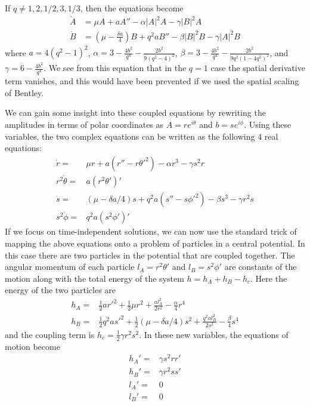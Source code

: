 \documentclass[api,pof,pre,12pt,a4paper]{revtex4-1}
\begin{document}
If $q\neq 1,2,1/2,3, 1/3$, then the equations become
\begin{align}
\dot{A}&=\mu A+a  A''-\alpha|A|^2A-\gamma|B|^2 A\\
\dot{B}&=\left(\mu-\frac{\delta a}{4}\right) B+q^2 a  B''-\beta|B|^2B-\gamma|A|^2 B
\end{align}
where $a=4(q^2-1)^2$, $\alpha=3-\tfrac{4 b^2}{q^4}-\tfrac{2 b^2}{9(q^2-4)^2}$, $\beta=3-\tfrac{4 b^2}{q^4}-\tfrac{2 b^2}{9q^2(1-4q^2)^2}$, and $\gamma=6-\frac{4 b^2}{q^4}$. We see from this equation that in the $q=1$ case the spatial derivative term vanishes, and this would have been prevented if we used the spatial scaling of Bentley.

We can gain some insight into these coupled equations by rewriting the amplitudes in terms of polar coordinates as $A=r e^{i\theta}$ and $b= s e^{i\phi}$.  Using these variables, the two complex equations can be written as the following 4 real equations:
\begin{subequations}
\begin{align}
\dot{r}=&\mu r + a(r'' - r\theta'^2) -\alpha r^3-\gamma s^2 r
\label{eq:rpolar} \\
r^2\dot{\theta}=&a(r^2\theta')'
\label{eq:thpolar}\\
\dot{s}=&(\mu-\delta a/4) s + q^2 a(s'' - s\phi'^2) -\beta s^3-\gamma r^2 s
\label{eq:spolar}\\
s^2\dot{\phi}=&q^2 a (s^2\phi')'
\label{eq:phpolar}
\end{align}
\end{subequations}
If we focus on time-independent solutions, we can now use the standard trick of mapping the above equations onto a problem of particles in a central potential.  In this case there are two particles in the potential that are coupled together.  The angular momentum of each particle $l_A=r^2\theta'$ and $l_B=s^2\phi'$ are constants of the motion along with the total energy of the system $h=h_A+h_B - h_c$.  Here the energy of the two particles are 
\begin{subequations}
\begin{align}
h_A=&\frac{1}{2} a r'^2 +\frac{1}{2}\mu r^2 + \frac{al_A^2}{2r^2}-\frac{\alpha}{4}r^4
\label{eq:hA} \\
h_B=&\frac{1}{2}q^2 a s'^2 +\frac{1}{2}(\mu-\delta a/4) s^2 + \frac{q^2al_B^2}{2s^2}-\frac{\beta}{4}s^4
\label{eq:hBr}
\end{align}
\end{subequations}
and the coupling term is $h_c=\frac{1}{2}\gamma r^2 s^2$.  In these new variables, the equations of motion become
\begin{subequations}
\begin{align}
h_A'=&\gamma s^2r r'\\
h_B'=&\gamma r^2 s s'\\
l_A'=&0\\
l_B'=&0
\end{align}
\end{subequations}
\end{document}

